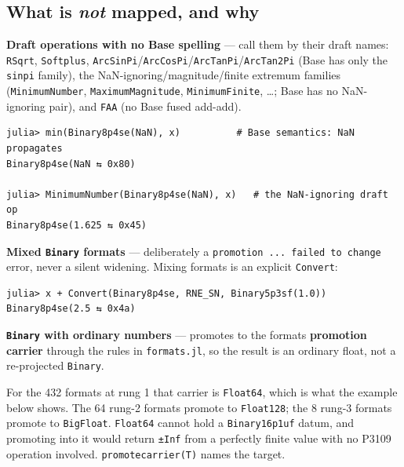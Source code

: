 \subsection{What is \emph{not} mapped, and why}



\label{2392765366633338434}{}


\textbf{Draft operations with no Base spelling} — call them by their draft names: \texttt{RSqrt}, \texttt{Softplus}, \texttt{ArcSinPi}/\allowbreak\texttt{ArcCosPi}/\texttt{ArcTanPi}/\allowbreak\texttt{ArcTan2Pi} (Base has only the \texttt{sinpi} family), the NaN-ignoring/magnitude/finite extremum families (\texttt{MinimumNumber}, \texttt{MaximumMagnitude}, \texttt{MinimumFinite}, …; Base has no NaN-ignoring pair), and \texttt{FAA} (no Base fused add-add).




\begin{verbatim}
julia> min(Binary8p4se(NaN), x)          # Base semantics: NaN propagates
Binary8p4se(NaN ⇆ 0x80)

julia> MinimumNumber(Binary8p4se(NaN), x)   # the NaN-ignoring draft op
Binary8p4se(1.625 ⇆ 0x45)
\end{verbatim}



\textbf{Mixed \texttt{Binary} formats} — deliberately a \texttt{promotion ... failed to change} error, never a silent widening. Mixing formats is an explicit \texttt{Convert}:




\nopagebreak[4]
\begin{verbatim}
julia> x + Convert(Binary8p4se, RNE_SN, Binary5p3sf(1.0))
Binary8p4se(2.5 ⇆ 0x4a)
\end{verbatim}



\textbf{\texttt{Binary} with ordinary numbers} — promotes to the format{\textquotesingle}s \textbf{promotion carrier} through the rules in \texttt{formats.jl}, so the result is an ordinary float, not a re-projected \texttt{Binary}.



For the 432 formats at rung 1 that carrier is \texttt{Float64}, which is what the example below shows. The 64 rung-2 formats promote to \texttt{Float128}; the 8 rung-3 formats promote to \texttt{BigFloat}. \texttt{Float64} cannot hold a \texttt{Binary16p1uf} datum, and promoting into it would return \texttt{±Inf} from a perfectly finite value with no P3109 operation involved. \texttt{promotecarrier(T)} names the target.




